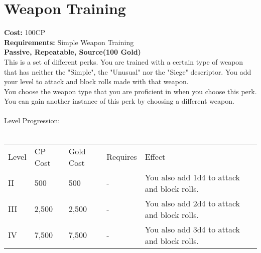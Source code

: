 \section{Weapon Training}
\textbf{Cost:} 100CP\\
\textbf{Requirements:} Simple Weapon Training\\
\textbf{Passive, Repeatable, Source(100 Gold)}\\
This is a set of different perks. You are trained with a certain type of weapon that has neither the "Simple", the "Unusual" nor the "Siege" descriptor. You add your level to attack and block rolls made with that weapon.\\
You choose the weapon type that you are proficient in when you choose this perk. You can gain another instance of this perk by choosing a different weapon.\\
\\
Level Progression:\\
\\
\begin{tabular}{l | l | l | l | l}
	Level & CP Cost & Gold Cost & Requires & Effect\\
	II & 500 & 500 & - & You also add 1d4 to attack and block rolls.\\
	III & 2,500 & 2,500 & - & You also add 2d4 to attack and block rolls.\\
	IV & 7,500 & 7,500 & - & You also add 3d4 to attack and block rolls.\\
\end{tabular}